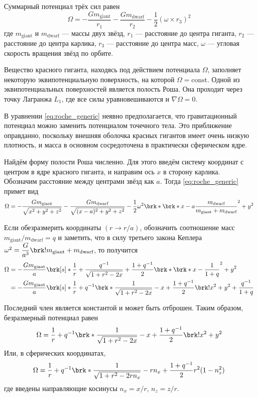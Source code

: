 Суммарный потенциал трёх сил равен
\begin{equation}
\Omega = 
-\frac{G m_\text{giant}}{r_1}
-\frac{G m_\text{dwarf}}{r_2}
-\frac{1}{2} (\omega \times r_3)^2
\label{eq:roche_generic}
\end{equation}
где $m_\text{giant}$ и $m_\text{dwarf}$ --- массы двух звёзд, $r_1$ --- расстояние до центра гиганта, $r_2$ --- расстояние до центра карлика, $r_3$ --- расстояние до центра масс, $\omega$ --- угловая скорость вращения звёзд по орбите.

Вещество красного гиганта, находясь под действием потенциала $\Omega$, заполняет некоторую эквипотенциальную поверхность, на которой $\Omega = \text{const}$. Одной из эквипотенциальных поверхностей является полость Роша. Она проходит через точку Лагранжа $L_1$, где все силы уравновешиваются и $\nabla \Omega = 0$.

В уравнении \eqref{eq:roche_generic} неявно предполагается, что гравитационный потенциал можно заменить потенциалом точечного тела. Это приближение оправданно, поскольку внешняя оболочка красных гигантов имеет очень низкую плотность, и масса в основном сосредоточена в практически сферическом ядре.

Найдём форму полости Роша численно. Для этого введём систему координат с центром в ядре красного гиганта, и направим ось $x$ в сторону карлика. Обозначим расстояние между центрами звёзд как $a$. Тогда \eqref{eq:roche_generic} примет вид
\[
\Omega =
-\frac{G m_\text{giant}}{\sqrt{x^2 + y^2 + z^2}}
-\frac{G m_\text{dwarf}}{\sqrt{(x - a)^2 + y^2 + z^2}}
-\frac{1}{2} \omega^2 \brk*{\brk*{x - a \frac{m_\text{dwarf}}{m_\text{giant} + m_\text{dwarf}}}^2 + y^2}
\]

Если обезразмерить координаты $(r \to r / a)$, обозначить соотношение масс $m_\text{giant} / m_\text{dwarf} = q$ и заметить, что в силу третьего закона Кеплера $\omega^2 = \dfrac{G}{a^3} \brk!{m_\text{giant} + m_\text{dwarf}}$, то получится
\begin{align*}
\Omega 
&= - \frac{G m_\text{giant}}{a} \brk[s]*{
    \frac{1}{r}
    + \frac{q^{-1}}{\sqrt{1 + r^2 - 2x}}
    + \frac{1 + q^{-1}}{2} \brk*{\brk*{x - \frac{1}{1+q}}^2 + y^2}
} \\
&= - \frac{G m_\text{giant}}{a} \brk[s]*{
    \frac{1}{r}
    + q^{-1} \brk*{
        \frac{1}{\sqrt{1 + r^2 - 2x}} - x
    }
    + \frac{1 + q^{-1}}{2} \brk!{x^2 + y^2}
    + \frac{q^{-1}}{1 + q}
}
\end{align*}

Последний член является константой и может быть отброшен. Таким образом, безразмерный потенциал равен
\begin{equation}
\Omega = \frac{1}{r} + q^{-1} \brk*{
    \frac{1}{\sqrt{1 + r^2 - 2x}} - x
}
+ \frac{1 + q^{-1}}{2} \brk!{x^2 + y^2}
\label{eq:roche_dekart}
\end{equation}
Или, в сферических координатах,
\begin{equation}
\Omega = \frac{1}{r} + q^{-1} \brk*{
    \frac{1}{\sqrt{1 + r^2 - 2r n_x}} - r n_x
}
+ \frac{1 + q^{-1}}{2} r^2 (1 - n_z^2)
\label{eq:roche_spherical}
\end{equation}
где введены направляющие косинусы $n_x = x / r$, $n_z = z / r$.

